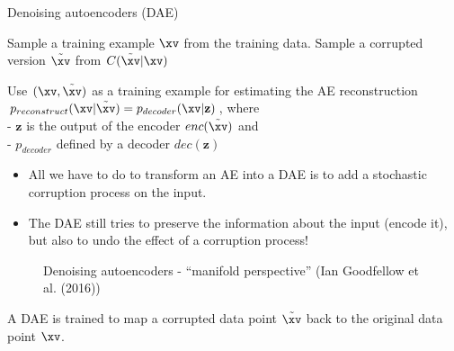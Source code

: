 \begin{vbframe}{Denoising autoencoders (DAE)}
\begin{algorithm}[H]
    \caption{Training denoising autoencoders}
    \begin{algorithmic}[1]
    \State Sample a training example $\xv$ from the training data.
    \State Sample a corrupted version $\tilde{\xv}$ from $C(\tilde{\xv}|\xv)$
    \State \parbox[t]{\dimexpr\linewidth-\algorithmicindent}{Use $(\xv, \tilde{\xv})$ as a training example for estimating the AE reconstruction $p_{reconstruct}(\xv|\tilde{\xv}) = p_{decoder}(\xv|\mathbf{z})$, where \\ 
    - $\mathbf{z}$ is the output of the encoder $enc(\tilde{\xv})$ and \\
    - $p_{decoder}$ defined by a decoder $dec(\mathbf{z})$}
    \end{algorithmic}
  \end{algorithm}
  \begin{itemize}
   \item All we have to do to transform an AE into a DAE is to add a stochastic corruption process on the input.
    \item The DAE still tries to preserve the information about the input (encode it), but also to undo the effect of a corruption process!
  \end{itemize} 
\framebreak
  \begin{figure}
    \centering
    \caption{Denoising autoencoders - \enquote{manifold perspective} (Ian Goodfellow et al. (2016))}
  \end{figure}
    A DAE is trained to map a corrupted data point $\tilde{\xv}$ back to
the original data point $\xv$.
  \framebreak
\begin{figure}
    \centering

\end{figure}
\end{vbframe}

